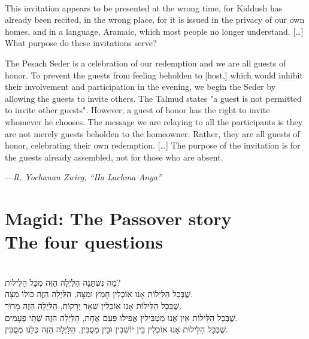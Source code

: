 \documentclass[a4paper,10pt,openany]{memoir}
\newcommand{\HgInst}[1]{{\noindent\sffamily{\bfseries{#1}}}}
\newcommand{\HgSource}[1]{\hfill{\small---\itshape{#1}}}
\newenvironment{HgEnglish}{\strut\\\noindent}{\vspace{1em}}
\newenvironment{HgHebrew}{\begin{hebrew}\strut\\\noindent\LARGE}{\end{hebrew}}
\begin{document}
\begin{HgEnglish}
This invitation appears to be presented at the wrong time, for Kiddush has
already been recited, in the wrong place, for it is issued in the privacy of our
own homes, and in a language, Aramaic, which most people no longer understand.
[\ldots] What purpose do these invitations serve?

The Pesach Seder is a celebration of our redemption and we are all guests of
honor. To prevent the guests from feeling beholden to [host,] which would
inhibit their involvement and participation in the evening, we begin the Seder
by allowing the guests to invite others. The Talmud states "a guest is not
permitted to invite other guests". However, a guest of honor has the right to
invite whomever he chooses. The message we are relaying to all the participants
is they are not merely guests beholden to the homeowner. Rather, they are all
guests of honor, celebrating their own redemption. [\ldots] The purpose of the
invitation is for the guests already assembled, not for those who are absent.

\HgSource{R. Yochanan Zwieg, ``Ha Lachma Anya''}
\end{HgEnglish}

\chapter*{Magid: The Passover story \\ {\LARGE The four questions}}

\vfill

\HgInst{The youngest person present recites:}

\begin{HgHebrew}
מַה נִּשְּׁתַּנָה הַלַּיְלָה הַזֶּה מִכָּל הַלֵּילוֹת? 
\\
שֶׁבְּכָל הַלֵּילוֹת אָנוּ אוֹכְלִין חָמֵץ וּמַצָּה,
הַלַּיְלָה הַזֶּה כּוּלוֹ מַצָּה. 
\\
שֶׁבְּכָל הַלֵּילוֹת אָנוּ אוֹכְלִין שְׁאָר יְרָקוֹת,
הַלַּיְלָה הַזֶּה מָרוֹר. 
\\
שֶׁבְּכָל הַלֵּילוֹת אֵין אֶנוּ מַטְבִּילִין אֲפִילוּ פַּעַם אֶחָת, 
הַלַּיְלָה הַזֶּה שְׁתֵּי פְעָמִים. 
\\
שֶׁבְּכָל הַלֵּילוֹת אָנוּ אוֹכְלִין בֵּין יוֹשְׁבִין וּבֵין מְסֻבִּין, 
הַלַּיְלָה הַזֶּה כֻּלָנו מְסֻבִּין. 
\end{HgHebrew}
\end{document}
